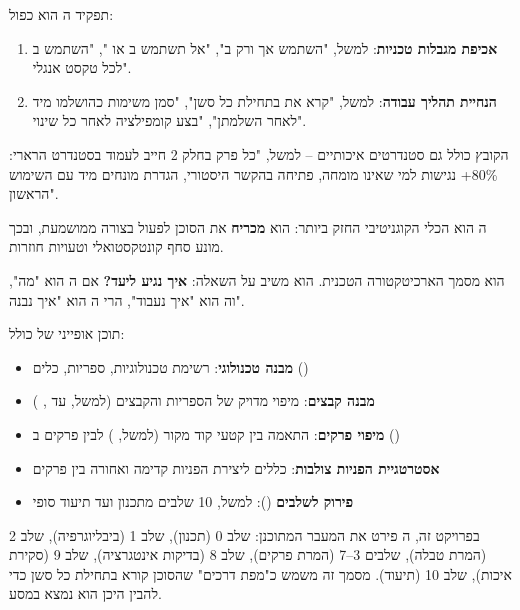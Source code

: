 תפקיד ה הוא כפול:
\begin{enumerate}
  \item \textbf{אכיפת מגבלות טכניות}: למשל, "השתמש אך ורק ב", "אל תשתמש ב או ", "השתמש ב לכל טקסט אנגלי".
  \item \textbf{הנחיית תהליך עבודה}: למשל, "קרא את  בתחילת כל סשן", "סמן משימות כהושלמו מיד לאחר השלמתן", "בצע קומפילציה לאחר כל שינוי".
\end{enumerate}

הקובץ כולל גם סטנדרטים איכותיים – למשל, "כל פרק בחלק \num{2} חייב לעמוד בסטנדרט הרארי: \num{80}\%+ נגישות למי שאינו מומחה, פתיחה בהקשר היסטורי, הגדרת מונחים מיד עם השימוש הראשון".

ה הוא הכלי הקוגניטיבי החזק ביותר: הוא \textbf{מכריח} את הסוכן לפעול בצורה ממושמעת, ובכך מונע סחף קונטקסטואלי וטעויות חוזרות.


\textbf{} הוא מסמך הארכיטקטורה הטכנית. הוא משיב על השאלה: \textbf{איך נגיע ליעד?} אם ה הוא "מה", וה הוא "איך נעבוד", הרי ה הוא "איך נבנה".

תוכן אופייני של  כולל:
\begin{itemize}
  \item \textbf{מבנה טכנולוגי}: רשימת טכנולוגיות, ספריות, כלים ()
  \item \textbf{מבנה קבצים}: מיפוי מדויק של הספריות והקבצים (למשל,  עד , )
  \item \textbf{מיפוי פרקים}: התאמה בין קטעי קוד מקור (למשל, ) לבין פרקים ב ()
  \item \textbf{אסטרטגיית הפניות צולבות}: כללים ליצירת הפניות קדימה ואחורה בין פרקים
  \item \textbf{פירוק לשלבים} (): למשל, \num{10} שלבים מתכנון ועד תיעוד סופי
\end{itemize}

בפרויקט זה, ה פירט את המעבר המתוכנן: שלב \num{0} (תכנון), שלב \num{1} (ביבליוגרפיה), שלב \num{2} (המרת טבלה), שלבים \num{3}–\num{7} (המרת פרקים), שלב \num{8} (בדיקות אינטגרציה), שלב \num{9} (סקירת איכות), שלב \num{10} (תיעוד). מסמך זה משמש כ"מפת דרכים" שהסוכן קורא בתחילת כל סשן כדי להבין היכן הוא נמצא במסע.


